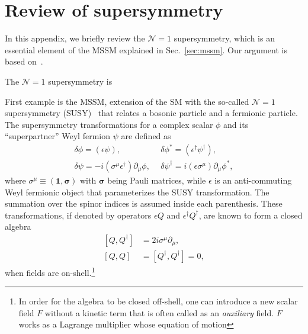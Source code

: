 \documentclass[12pt,twoside,book]{article}
\begin{document}
\section{Review of supersymmetry}
\label{sec:susy}

In this appendix, we briefly review the $\mathcal{N}=1$ supersymmetry,
which is an essential element of the MSSM explained in
Sec.~\ref{sec:mssm}.  Our argument is based on~\cite{Wess:320631,
Martin:1997ns}.

The $\mathcal{N}=1$ supersymmetry is

First example is the MSSM, extension of the SM with the so-called
$\mathcal{N}=1$ supersymmetry (SUSY)~\cite{Wess:320631, Martin:1997ns}
that relates a bosonic particle and a fermionic particle.  The
supersymmetry transformations for a complex scalar $\phi$ and its
``superpartner'' Weyl fermion $\psi$ are defined as
\begin{align}
 \delta \phi = \left( \epsilon \psi \right),
 ~&~
 \delta \phi^{*} = \left( \epsilon^\dagger \psi^\dagger \right),\\
 \delta \psi = -i \left(\sigma^\mu \epsilon^\dagger \right) \partial_\mu \phi,
 ~&~
 \delta \psi^\dagger = i \left(\epsilon \sigma^\mu \right) \partial_\mu \phi^{*},
\end{align}
where $\sigma^\mu \equiv (\bm{1}, \bm{\sigma})$ with $\bm{\sigma}$
being Pauli matrices, while $\epsilon$ is an anti-commuting Weyl
fermionic object that parameterizes the SUSY transformation.  The
summation over the spinor indices is assumed inside each parenthesis.
These transformations, if denoted by operators $\epsilon Q$ and
$\epsilon^\dagger Q^\dagger$, are known to form a closed algebra
\begin{align}
 \left[ Q, Q^\dagger \right] &= 2 i \sigma^\mu \partial_\mu,\\
 \left[ Q, Q \right] &= \left[ Q^\dagger, Q^\dagger \right] = 0,
\end{align}
when fields are on-shell.\footnote{
In order for the algebra to be closed off-shell, one can introduce a
new scalar field $F$ without a kinetic term that is often called as an
\textit{auxiliary} field.  $F$ works as a Lagrange multiplier whose
equation of motion }
\end{document}
